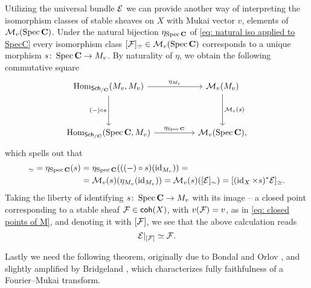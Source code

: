 \begin{remark}
    \label{Points of M are sheaves}
Utilizing the universal bundle $\mathcal E$ we can provide another way of interpreting the isomorphism classes of stable sheaves on $X$ with Mukai vector $v$, \ie elements of $\mathcal M_v(\operatorname{Spec}\mathbf C)$. Under the natural bijection $\eta_{\operatorname{Spec}\mathbf C}$ of \eqref{eq: natural iso applied to SpecC} every isomorphism class $[\mathcal F]_\simeq \in \mathcal M_v(\operatorname{Spec}\mathbf C)$ corresponds to a unique morphism $s \colon \operatorname{Spec}\mathbf C \to M_v$. By naturality of $\eta$, we obtain the following commutative square 
\[\begin{tikzcd}[column sep = normal, row sep = 1.8em]
	\Hom_{\sch{\C}}(M_v, M_v) && \M_v(M_v) \\
	\\
	\Hom_{\sch{\C}}(\spec{\C}, M_v) && \M_v(\spec{\C}),
	\arrow["{\eta_{M_v}}", from=1-1, to=1-3]
	\arrow["{(-) \circ s}"', from=1-1, to=3-1]
	\arrow["{\M_v(s)}", from=1-3, to=3-3]
	\arrow["\eta_{\spec{\C}}", from=3-1, to=3-3]
\end{tikzcd}\]
which spells out that 
\begin{align*}
    [\F]_\iso = \eta_{\spec{\C}}(s) &= \eta_{\spec{\C}}(((-)\circ s)(\id{M_v})) = \\
    &= \M_v(s)(\eta_{M_v}(\id{M_v})) = \M_v(s)([\E]_\sim) = [(\id{X} \times s)^*\E]_\iso.
\end{align*}
Taking the liberty of identifying $s \colon \operatorname{Spec}\mathbf C \to M_v$ with its image -- a closed point corresponding to a stable sheaf $\mathcal F \in \mathsf{coh}(X)$, with $v(\mathcal F) = v$, as in \eqref{eq: closed points of M}, and denoting it with $[\mathcal F]$, we see that the above calculation reads
\[
    \mathcal E|_{[\mathcal F]} \simeq \mathcal F.
\]
\end{remark}



Lastly we need the following theorem, originally due to Bondal and Orlov \cite[]{BondalOrlov1995}, and slightly amplified by Bridgeland \cite[]{bridgeland2019equivalencestriangulatedcategoriesfouriermukai}, which characterizes fully faithfulness of a Fourier--Mukai transform. 


